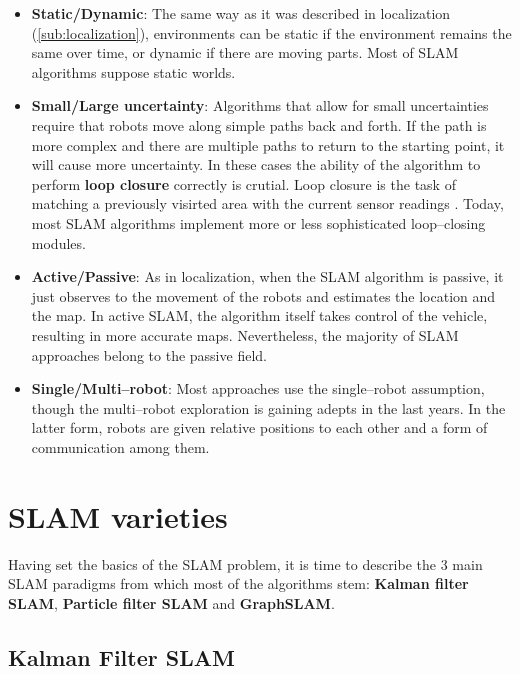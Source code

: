 \begin{itemize}
  \item \textbf{Static/Dynamic}: The same way as it was described in localization (\autoref{sub:localization}), environments can be static if the environment remains the same over time, or dynamic if there are moving parts. Most of SLAM algorithms suppose static worlds.

  \item \textbf{Small/Large uncertainty}: Algorithms that allow for small uncertainties require that robots move along simple paths back and forth. If the path is more complex and there are multiple paths to return to the starting point, it will cause more uncertainty. In these cases the ability of the algorithm to perform \textbf{loop closure} correctly is crutial. Loop closure is the task of matching a previously visirted area with the current sensor readings . Today, most SLAM algorithms implement more or less sophisticated loop--closing modules. 

  \item \textbf{Active/Passive}: As in localization, when the SLAM algorithm is passive, it just observes to the movement of the robots and estimates the location and the map. In active SLAM, the algorithm itself takes control of the vehicle, resulting in more accurate maps. Nevertheless, the majority of SLAM approaches belong to the passive field.

  \item \textbf{Single/Multi--robot}: Most approaches use the single--robot assumption, though the multi--robot exploration is gaining adepts in the last years. In the latter form, robots are given relative positions to each other and a form of communication among them.
\end{itemize}

\section{SLAM varieties} \label{sec:varieties}

Having set the basics of the SLAM problem, it is time to describe the 3 main SLAM paradigms from which most of the algorithms stem: \textbf{Kalman filter SLAM}, \textbf{Particle filter SLAM} and \textbf{GraphSLAM}.

\subsection{Kalman Filter SLAM} \label{sub:ekf}

